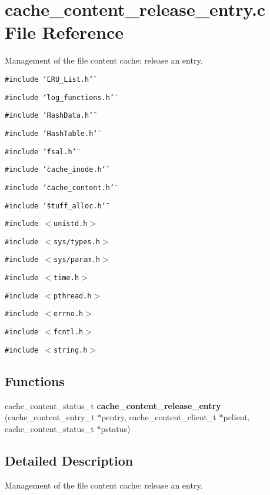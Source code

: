 \section{cache\_\-content\_\-release\_\-entry.c File Reference}
\label{cache__content__release__entry_8c}
Management of the file content cache: release an entry. 

{\tt \#include \char`\"{}LRU\_\-List.h\char`\"{}}\par
{\tt \#include \char`\"{}log\_\-functions.h\char`\"{}}\par
{\tt \#include \char`\"{}Hash\-Data.h\char`\"{}}\par
{\tt \#include \char`\"{}Hash\-Table.h\char`\"{}}\par
{\tt \#include \char`\"{}fsal.h\char`\"{}}\par
{\tt \#include \char`\"{}cache\_\-inode.h\char`\"{}}\par
{\tt \#include \char`\"{}cache\_\-content.h\char`\"{}}\par
{\tt \#include \char`\"{}stuff\_\-alloc.h\char`\"{}}\par
{\tt \#include $<$unistd.h$>$}\par
{\tt \#include $<$sys/types.h$>$}\par
{\tt \#include $<$sys/param.h$>$}\par
{\tt \#include $<$time.h$>$}\par
{\tt \#include $<$pthread.h$>$}\par
{\tt \#include $<$errno.h$>$}\par
{\tt \#include $<$fcntl.h$>$}\par
{\tt \#include $<$string.h$>$}\par
\subsection*{Functions}
\begin{CompactItemize}
\item 
cache\_\-content\_\-status\_\-t {\bf cache\_\-content\_\-release\_\-entry} (cache\_\-content\_\-entry\_\-t $\ast$pentry, cache\_\-content\_\-client\_\-t $\ast$pclient, cache\_\-content\_\-status\_\-t $\ast$pstatus)
\end{CompactItemize}


\subsection{Detailed Description}
Management of the file content cache: release an entry. 

